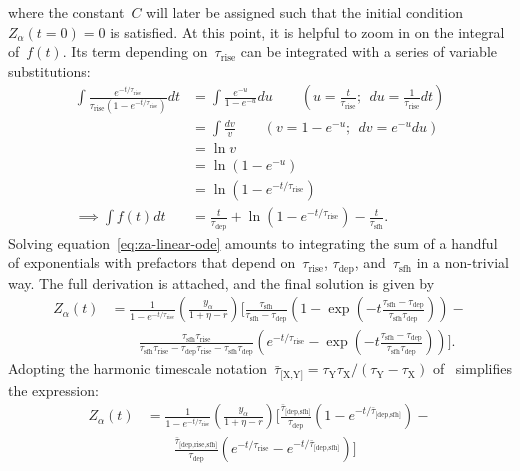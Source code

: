 \documentclass[12pt]{article}
\newcommand{\timescale}[1]{\ensuremath{\tau_\text{#1}}}
\newcommand{\harmonic}[2]{\ensuremath{\bar{\tau}_\text{[#1,#2]}}}
\newcommand{\hharmonic}[3]{\ensuremath{\bar{\tau}_\text{[#1,#2,#3]}}}
\begin{document}
where the constant~$C$ will later be assigned such that the initial
condition~$Z_\alpha(t = 0) = 0$ is satisfied.
At this point, it is helpful to zoom in on the integral of~$f(t)$.
Its term depending on~$\timescale{rise}$ can be integrated with a series of
variable substitutions:
\begin{subequations}\begin{align}
\int \frac{
	e^{-t / \timescale{rise}}
}{
	\timescale{rise}(1 - e^{-t / \timescale{rise}})
} dt
&= \int \frac{e^{-u}}{1 - e^{-u}} du
\qquad \left(u = \frac{t}{\timescale{rise}};~~du = \frac{1}{\timescale{rise}}
dt\right)
\\
&= \int \frac{dv}{v} \qquad \left(v = 1 - e^{-u};~~dv = e^{-u} du\right)
\\
&= \ln v
\\
&= \ln (1 - e^{-u})
\\
&= \ln (1 - e^{-t / \timescale{rise}})
\\
\implies \int f(t) dt
&= \frac{t}{\timescale{dep}} + \ln (1 - e^{-t / \timescale{rise}}) -
\frac{t}{\timescale{sfh}}.
\end{align}\end{subequations}
Solving equation~\ref{eq:za-linear-ode} amounts to integrating the sum of a
handful of exponentials with prefactors that depend on~\timescale{rise},
\timescale{dep}, and~\timescale{sfh} in a non-trivial way.
The full derivation is attached, and the final solution is given by
\begin{equation}
\begin{split}
Z_\alpha(t) &= \frac{1}{1 - e^{-t / \timescale{rise}}}
\left(\frac{y_\alpha}{1 + \eta - r}\right)
\bigg[\frac{
	\timescale{sfh}
}{
	\timescale{sfh} - \timescale{dep}
} \left(
1 - \exp\left(-t\frac{
	\timescale{sfh} - \timescale{dep}
}{
	\timescale{sfh}\timescale{dep}
}\right)
\right) -
\\
&\qquad \frac{
	\timescale{sfh}\timescale{rise}
}{
	\timescale{sfh}\timescale{rise} - \timescale{dep}\timescale{rise} -
	\timescale{sfh}\timescale{dep}
} \left(e^{-t / \timescale{rise}} -
\exp\left(-t
\frac{
	\timescale{sfh} - \timescale{dep}
}{
	\timescale{sfh}\timescale{dep}
}
\right)
\right)\bigg].
\end{split}
\end{equation}
Adopting the harmonic timescale notation~$\harmonic{X}{Y} = \timescale{Y}
\timescale{X} / (\timescale{Y} - \timescale{X})$ of~\citet*{Weinberg2017}
simplifies the expression:
\begin{equation}
\begin{split}
Z_\alpha(t) &= \frac{1}{1 - e^{-t / \timescale{rise}}} \left( \frac{
	y_\alpha
}{
	1 + \eta - r
}\right) \bigg[
\frac{\harmonic{dep}{sfh}}{\timescale{dep}}
\left(1 - e^{-t / \harmonic{dep}{sfh}}\right) -
\\
&\qquad \frac{\hharmonic{dep}{rise}{sfh}}{\timescale{dep}}
\left(e^{-t / \timescale{rise}} - e^{-t / \harmonic{dep}{sfh}}\right)
\bigg]
\end{split}
\label{eq:zalpha}
\end{equation}
\end{document}
